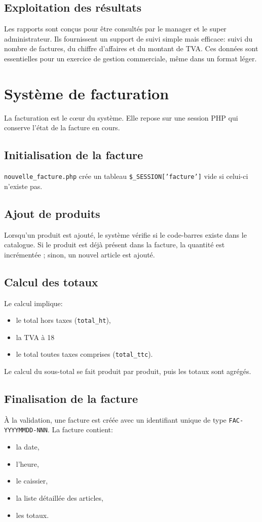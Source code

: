 \documentclass[12pt,a4paper]{article}
\begin{document}
\subsection{Exploitation des résultats}
Les rapports sont conçus pour être consultés par le manager et le super administrateur. Ils fournissent un support de suivi simple mais efficace: suivi du nombre de factures, du chiffre d'affaires et du montant de TVA. Ces données sont essentielles pour un exercice de gestion commerciale, même dans un format léger.

\newpage

\section{Système de facturation}
La facturation est le cœur du système. Elle repose sur une session PHP qui conserve l'état de la facture en cours.

\subsection{Initialisation de la facture}
\texttt{nouvelle\_facture.php} crée un tableau \texttt{\$\_SESSION['facture']} vide si celui-ci n'existe pas.

\subsection{Ajout de produits}
Lorsqu'un produit est ajouté, le système vérifie si le code-barres existe dans le catalogue. Si le produit est déjà présent dans la facture, la quantité est incrémentée ; sinon, un nouvel article est ajouté.

\subsection{Calcul des totaux}
Le calcul implique:
\begin{itemize}
  \item le total hors taxes (\texttt{total\_ht}),
  \item la TVA à 18%
  \item le total toutes taxes comprises (\texttt{total\_ttc}).
\end{itemize}

Le calcul du sous-total se fait produit par produit, puis les totaux sont agrégés.

\subsection{Finalisation de la facture}
À la validation, une facture est créée avec un identifiant unique de type \texttt{FAC-YYYYMMDD-NNN}. La facture contient:
\begin{itemize}
  \item la date,
  \item l'heure,
  \item le caissier,
  \item la liste détaillée des articles,
  \item les totaux.
\end{itemize}
\end{document}
